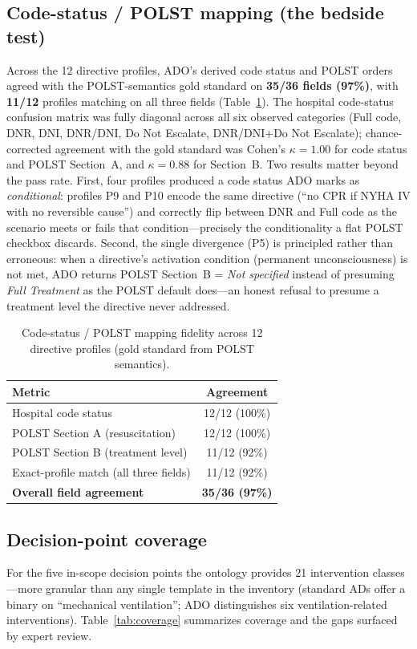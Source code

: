 \documentclass[10pt]{article}
\begin{document}
\subsection{Code-status / POLST mapping (the bedside test)}
Across the 12 directive profiles, ADO's derived code status and POLST orders agreed with the POLST-semantics gold standard on \textbf{35/36 fields (97\%)}, with \textbf{11/12} profiles matching on all three fields (Table~\ref{tab:track3}). The hospital code-status confusion matrix was fully diagonal across all six observed categories (Full code, DNR, DNI, DNR/DNI, Do Not Escalate, DNR/DNI+Do Not Escalate); chance-corrected agreement with the gold standard was Cohen's $\kappa=1.00$ for code status and POLST Section~A, and $\kappa=0.88$ for Section~B. Two results matter beyond the pass rate. First, four profiles produced a code status ADO marks as \emph{conditional}: profiles P9 and P10 encode the same directive (``no CPR if NYHA IV with no reversible cause'') and correctly flip between DNR and Full code as the scenario meets or fails that condition---precisely the conditionality a flat POLST checkbox discards. Second, the single divergence (P5) is principled rather than erroneous: when a directive's activation condition (permanent unconsciousness) is not met, ADO returns POLST Section~B = \emph{Not specified} instead of presuming \emph{Full Treatment} as the POLST default does---an honest refusal to presume a treatment level the directive never addressed.

\begin{table}[ht]
\centering
\caption{Code-status / POLST mapping fidelity across 12 directive profiles (gold standard from POLST semantics).}
\label{tab:track3}
\small
\begin{tabularx}{0.95\textwidth}{Xc}
\toprule
\textbf{Metric} & \textbf{Agreement} \\
\midrule
Hospital code status & 12/12 (100\%) \\
POLST Section A (resuscitation) & 12/12 (100\%) \\
POLST Section B (treatment level) & 11/12 (92\%) \\
Exact-profile match (all three fields) & 11/12 (92\%) \\
\textbf{Overall field agreement} & \textbf{35/36 (97\%)} \\
\bottomrule
\end{tabularx}
\end{table}

\subsection{Decision-point coverage}
For the five in-scope decision points the ontology provides 21 intervention classes---more granular than any single template in the inventory (standard ADs offer a binary on ``mechanical ventilation''; ADO distinguishes six ventilation-related interventions). Table~\ref{tab:coverage} summarizes coverage and the gaps surfaced by expert review.
\end{document}
